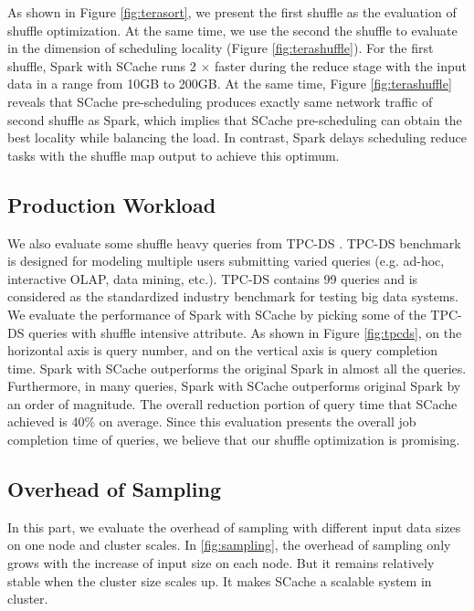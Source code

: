As shown in Figure \ref{fig:terasort}, we present the first shuffle as the evaluation of shuffle optimization. At the same time, we use the second the shuffle to evaluate in the dimension of scheduling locality (Figure \ref{fig:terashuffle}). For the first shuffle, Spark with SCache runs 2 $\times$ faster during the reduce stage with the input data in a range from 10GB to 200GB. At the same time, Figure \ref{fig:terashuffle} reveals that SCache pre-scheduling produces exactly same network traffic of second shuffle as Spark, which implies that SCache pre-scheduling can obtain the best locality while balancing the load. In contrast, Spark delays scheduling reduce tasks with the shuffle map output to achieve this optimum.

\subsection{Production Workload}
We also evaluate some shuffle heavy queries from TPC-DS \cite{tpcds}. TPC-DS benchmark is designed for modeling multiple users submitting varied queries (e.g. ad-hoc, interactive OLAP, data mining, etc.). TPC-DS contains 99 queries and is considered as the standardized industry benchmark for testing big data systems. We evaluate the performance of Spark with SCache by picking some of the TPC-DS queries with shuffle intensive attribute. As shown in Figure \ref{fig:tpcds}, on the horizontal axis is query number, and on the vertical axis is query completion time. Spark with SCache outperforms the original Spark in almost all the queries. Furthermore, in many queries, Spark with SCache outperforms original Spark by an order of magnitude. The overall reduction portion of query time that SCache achieved is 40\% on average. Since this evaluation presents the overall job completion time of queries, we believe that our shuffle optimization is promising.
\subsection{Overhead of Sampling}
In this part, we evaluate the overhead of sampling with different input data sizes on one node and cluster scales. In \ref{fig:sampling}, the overhead of sampling only grows with the increase of input size on each node. But it remains relatively stable when the cluster size scales up. It makes SCache a scalable system in cluster.
